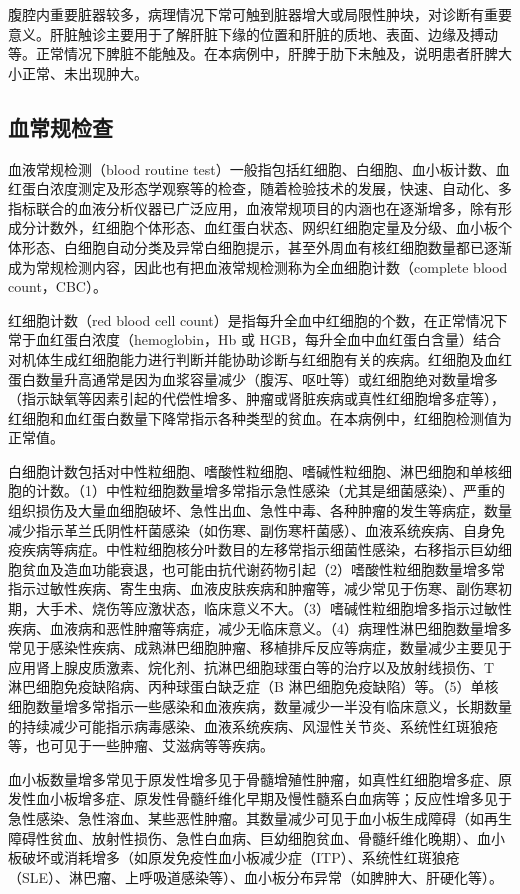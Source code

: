 \documentclass[9pt,a4paper,twoside]{rho-class/rho}
\begin{document}
    腹腔内重要脏器较多，病理情况下常可触到脏器增大或局限性肿块，对诊断有重要意义。肝脏触诊主要用于了解肝脏下缘的位置和肝脏的质地、表面、边缘及搏动等。正常情况下脾脏不能触及。在本病例中，肝脾于肋下未触及，说明患者肝脾大小正常、未出现肿大。

    \subsection{血常规检查}

    血液常规检测（blood routine test）一般指包括红细胞、白细胞、血小板计数、血红蛋白浓度测定及形态学观察等的检查，随着检验技术的发展，快速、自动化、多指标联合的血液分析仪器已广泛应用，血液常规项目的内涵也在逐渐增多，除有形成分计数外，红细胞个体形态、血红蛋白状态、网织红细胞定量及分级、血小板个体形态、白细胞自动分类及异常白细胞提示，甚至外周血有核红细胞数量都已逐渐成为常规检测内容，因此也有把血液常规检测称为全血细胞计数（complete blood count，CBC）。

    红细胞计数（red blood cell count）是指每升全血中红细胞的个数，在正常情况下常于血红蛋白浓度（hemoglobin，Hb 或 HGB，每升全血中血红蛋白含量）结合对机体生成红细胞能力进行判断并能协助诊断与红细胞有关的疾病。红细胞及血红蛋白数量升高通常是因为血浆容量减少（腹泻、呕吐等）或红细胞绝对数量增多（指示缺氧等因素引起的代偿性增多、肿瘤或肾脏疾病或真性红细胞增多症等），红细胞和血红蛋白数量下降常指示各种类型的贫血。在本病例中，红细胞检测值为正常值。

    白细胞计数包括对中性粒细胞、嗜酸性粒细胞、嗜碱性粒细胞、淋巴细胞和单核细胞的计数。（1）中性粒细胞数量增多常指示急性感染（尤其是细菌感染）、严重的组织损伤及大量血细胞破坏、急性出血、急性中毒、各种肿瘤的发生等病症，数量减少指示革兰氏阴性杆菌感染（如伤寒、副伤寒杆菌感）、血液系统疾病、自身免疫疾病等病症。中性粒细胞核分叶数目的左移常指示细菌性感染，右移指示巨幼细胞贫血及造血功能衰退，也可能由抗代谢药物引起（2）嗜酸性粒细胞数量增多常指示过敏性疾病、寄生虫病、血液皮肤疾病和肿瘤等，减少常见于伤寒、副伤寒初期，大手术、烧伤等应激状态，临床意义不大。（3）嗜碱性粒细胞增多指示过敏性疾病、血液病和恶性肿瘤等病症，减少无临床意义。（4）病理性淋巴细胞数量增多常见于感染性疾病、成熟淋巴细胞肿瘤、移植排斥反应等病症，数量减少主要见于应用肾上腺皮质激素、烷化剂、抗淋巴细胞球蛋白等的治疗以及放射线损伤、T 淋巴细胞免疫缺陷病、丙种球蛋白缺乏症（B 淋巴细胞免疫缺陷）等。（5）单核细胞数量增多常指示一些感染和血液疾病，数量减少一半没有临床意义，长期数量的持续减少可能指示病毒感染、血液系统疾病、风湿性关节炎、系统性红斑狼疮等，也可见于一些肿瘤、艾滋病等等疾病。

    血小板数量增多常见于原发性增多见于骨髓增殖性肿瘤，如真性红细胞增多症、原发性血小板增多症、原发性骨髓纤维化早期及慢性髓系白血病等；反应性增多见于急性感染、急性溶血、某些恶性肿瘤。其数量减少可见于血小板生成障碍（如再生障碍性贫血、放射性损伤、急性白血病、巨幼细胞贫血、骨髓纤维化晚期）、血小板破坏或消耗增多（如原发免疫性血小板减少症（ITP）、系统性红斑狼疮（SLE）、淋巴瘤、上呼吸道感染等）、血小板分布异常（如脾肿大、肝硬化等）。
\end{document}
